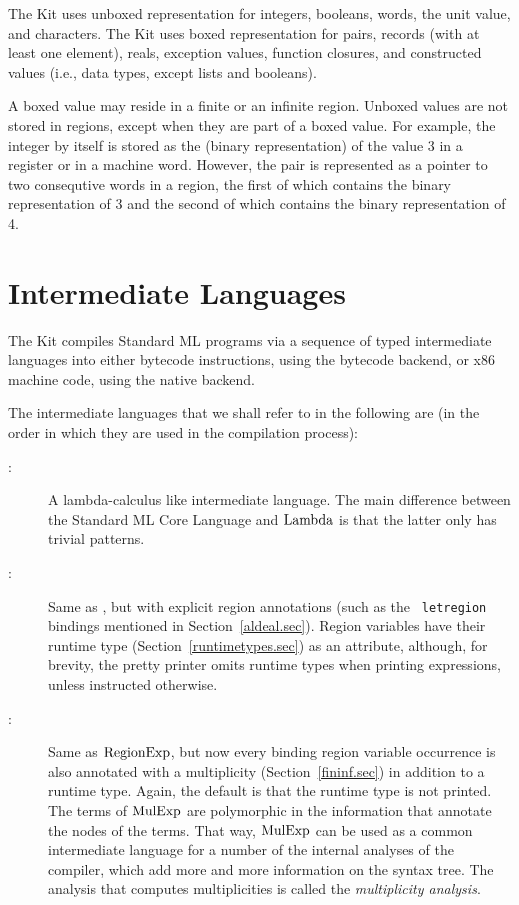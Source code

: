 \documentclass[12pt]{book}
\begin{document}
The Kit uses unboxed representation for integers, booleans, words, the
unit value, and characters.  The Kit uses boxed representation for
pairs, records (with at least one element), reals, exception values,
function closures, and constructed values (i.e., data types, except
lists and booleans).

A boxed value may reside in a finite or an infinite region.  Unboxed
values are not stored in regions, except when they are part of a boxed
value. For example, the integer  by itself is stored as the
(binary representation) of the value 3 in a register or in a machine
word. However, the pair  is represented as a pointer to
two consequtive words in a region, the first of which contains the
binary representation of 3 and the second of which contains the binary
representation of 4.

\section{Intermediate Languages}
The Kit compiles Standard ML programs via a sequence of typed
intermediate languages into either bytecode instructions, using the
bytecode backend, or x86 machine code, using the native backend.

The intermediate languages that we shall refer to in the following are
(in the order in which they are used in the compilation process):
\begin{description}
\item[\Lam:] 
  A lambda-calculus like intermediate language. The main difference
  between the Standard ML Core Language and $\hbox{\rm Lambda}$ is that the latter
  only has trivial patterns.
\item[\RegExp:] 
  Same as \Lam, but with explicit region annotations (such as the {\tt
    letregion} bindings mentioned in Section~\ref{aldeal.sec}). Region
  variables have their runtime type (Section~\ref{runtimetypes.sec})
  as an attribute, although, for brevity, the pretty printer omits
  runtime types when printing expressions, unless instructed
  otherwise.
\item[\MulExp:] 
  Same as $\hbox{\rm RegionExp}$, but now every binding region variable occurrence
  is also annotated with a multiplicity (Section~\ref{fininf.sec}) in
  addition to a runtime type.  Again, the default is that the runtime
  type is not printed.  The terms of $\hbox{\rm MulExp}$ are polymorphic in the
  information that annotate the nodes of the terms. That way,
  $\hbox{\rm MulExp}$ can be used as a common intermediate language for a number
  of the internal analyses of the compiler, which add more and more
  information on the syntax tree.  The analysis that computes
  multiplicities is called the
  {\em multiplicity analysis}.
\end{description}
\end{document}
